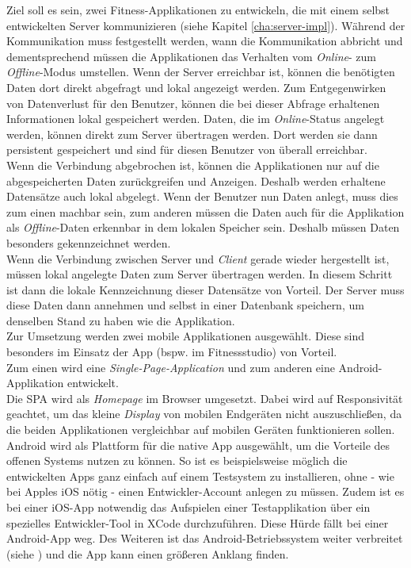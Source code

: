 Ziel soll es sein, zwei Fitness-Applikationen zu entwickeln, die mit einem selbst entwickelten Server kommunizieren (siehe Kapitel \ref{cha:server-impl}). Während der Kommunikation muss festgestellt werden, wann die Kommunikation abbricht und dementsprechend müssen die Applikationen das Verhalten vom \textit{Online}- zum \textit{Offline}-Modus umstellen. Wenn der Server erreichbar ist, können die benötigten Daten dort direkt abgefragt und lokal angezeigt werden. Zum Entgegenwirken von Datenverlust für den Benutzer, können die bei dieser Abfrage erhaltenen Informationen lokal gespeichert werden. Daten, die im \textit{Online}-Status angelegt werden, können direkt zum Server übertragen werden. Dort werden sie dann persistent gespeichert und sind für diesen Benutzer von überall erreichbar.\\
Wenn die Verbindung abgebrochen ist, können die Applikationen nur auf die abgespeicherten Daten zurückgreifen und Anzeigen. Deshalb werden erhaltene Datensätze auch lokal abgelegt. Wenn der Benutzer nun Daten anlegt, muss dies zum einen machbar sein, zum anderen müssen die Daten auch für die Applikation als \textit{Offline}-Daten erkennbar in dem lokalen Speicher sein. Deshalb müssen Daten besonders gekennzeichnet werden.\\
Wenn die Verbindung zwischen Server und \textit{Client} gerade wieder hergestellt ist, müssen lokal angelegte Daten zum Server übertragen werden. In diesem Schritt ist dann die lokale Kennzeichnung dieser Datensätze von Vorteil. Der Server muss diese Daten dann annehmen und selbst in einer Datenbank speichern, um denselben Stand zu haben wie die Applikation.\\

Zur Umsetzung werden zwei mobile Applikationen ausgewählt. Diese sind besonders im Einsatz der App (bspw. im Fitnessstudio) von Vorteil. \\
Zum einen wird eine \textit{Single-Page-Application} und zum anderen eine Android-Applikation entwickelt.\\
Die \ac{SPA} wird als \textit{Homepage} im Browser umgesetzt. Dabei wird auf Responsivität geachtet, um das kleine \textit{Display} von mobilen Endgeräten nicht auszuschließen, da die beiden Applikationen vergleichbar auf mobilen Geräten funktionieren sollen.\\
Android wird als Plattform für die native App ausgewählt, um die Vorteile des offenen Systems nutzen zu können. So ist es beispielsweise möglich die entwickelten Apps ganz einfach auf einem Testsystem zu installieren, ohne - wie bei Apples iOS nötig - einen Entwickler-Account anlegen zu müssen. Zudem ist es bei einer iOS-App notwendig das Aufspielen einer Testapplikation über ein spezielles Entwickler-Tool in XCode durchzuführen. Diese Hürde fällt bei einer Android-App weg. Des Weiteren ist das Android-Betriebssystem weiter verbreitet (siehe \citep{Statista-SmartphoneVerteilung}) und die App kann einen größeren Anklang finden.

